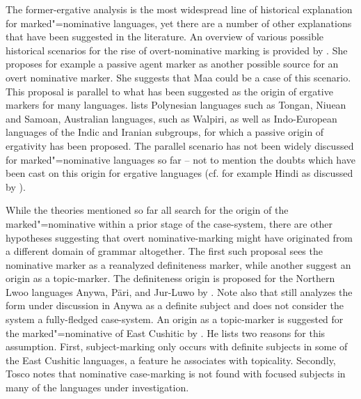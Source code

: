 The former-ergative analysis is the most widespread line of historical explanation for marked"=nominative languages, yet there are a number of other explanations that have been suggested in the literature. 
An overview of various possible historical scenarios for the rise of overt-nominative marking is provided by \citet[178]{Koenig:2008}.  
She proposes for example a passive agent marker as another possible source for an overt nominative marker. She suggests that Maa could be a case of this scenario. 
This pro\-po\-sal is parallel to what has been suggested as the origin of ergative markers for many languages. \citet{Anderson:1977} lists Polynesian languages such as Tongan, Niuean and Samoan, Australian languages, such as Walpiri, as well as Indo-European languages of the Indic and Iranian subgroups, for which a passive origin of ergativity has been proposed.  
The parallel scenario has not been widely discussed for marked"=nominative languages so far -- not to mention the doubts which have been cast on this origin for ergative languages (cf. for example Hindi as discussed by \citealp{ButtKing:2004}).

While the theories mentioned so far all search for the origin of the marked"=nominative within a prior stage of the case-system, there are other hypotheses suggesting that overt nominative-marking might have originated from a different domain of grammar altogether. 
The first such proposal sees the nominative marker as a reanalyzed definiteness marker, while another suggest an origin as a topic-marker. 
The definiteness origin is proposed for the Northern Lwoo languages Anywa, P\"ari, and Jur-Luwo by \citet[179]{Koenig:2008}. 
Note also that \citet{Reh:1996} still analyzes the form under discussion in Anywa as a definite subject and does not consider the system a fully-fledged case-system. 
An origin as a topic-marker is suggested for the marked"=nominative of East Cushitic by \citet{Tosco:1994}. 
He lists two reasons for this assumption. 
First, subject-marking  only occurs with definite subjects in some of the East Cushitic languages, a feature he associates with topicality. 
Secondly, Tosco notes that nominative case-marking is not found with focused subjects in many of the languages under investigation. 

